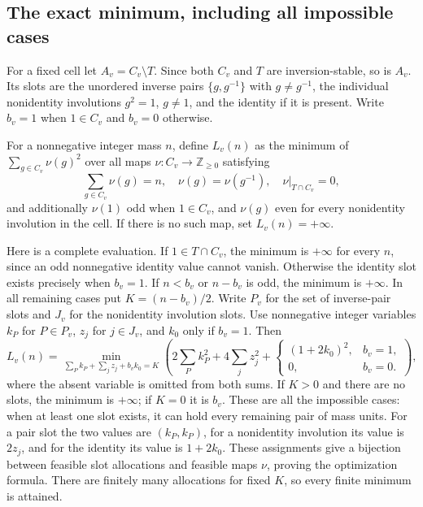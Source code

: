 \subsection{The exact minimum, including all impossible cases}
For a fixed cell let $A_v=C_v\setminus T$. Since both $C_v$ and $T$
are inversion-stable, so is $A_v$. Its slots are the unordered inverse
pairs $\{g,g^{-1}\}$ with $g\ne g^{-1}$, the individual nonidentity
involutions $g^2=1$, $g\ne1$, and the identity if it is present.
Write $b_v=1$ when $1\in C_v$ and $b_v=0$ otherwise.

For a nonnegative integer mass $n$, define $L_v(n)$ as the minimum of
$\sum_{g\in C_v}\nu(g)^2$ over all maps
$\nu:C_v\to\mathbb Z_{\geq0}$ satisfying
\[
 \sum_{g\in C_v}\nu(g)=n,\quad
 \nu(g)=\nu(g^{-1}),\quad
 \nu|_{T\cap C_v}=0,
\]
and additionally $\nu(1)$ odd when $1\in C_v$, and $\nu(g)$ even
for every nonidentity involution in the cell. If there is no such map,
set $L_v(n)=+\infty$.

Here is a complete evaluation. If $1\in T\cap C_v$, the minimum is
$+\infty$ for every $n$, since an odd nonnegative identity value cannot
vanish. Otherwise the identity slot exists precisely when $b_v=1$.
If $n<b_v$ or $n-b_v$ is odd, the minimum is $+\infty$.
In all remaining cases put $K=(n-b_v)/2$. Write $P_v$ for the set
of inverse-pair slots and $J_v$ for the nonidentity involution slots.
Use nonnegative integer variables $k_P$ for $P\in P_v$, $z_j$ for
$j\in J_v$, and $k_0$ only if $b_v=1$. Then
\[
 L_v(n)=\min_{\sum_P k_P+\sum_j z_j+b_vk_0=K}
 \left(2\sum_P k_P^2+4\sum_j z_j^2+
 \begin{cases}(1+2k_0)^2,&b_v=1,\\0,&b_v=0.\end{cases}\right),
\]
where the absent variable is omitted from both sums. If $K>0$ and
there are no slots, the minimum is $+\infty$; if $K=0$ it is $b_v$.
These are all the impossible cases: when at least one slot exists, it
can hold every remaining pair of mass units. For a pair slot the two
values are $(k_P,k_P)$, for a nonidentity involution its value is
$2z_j$, and for the identity its value is $1+2k_0$. These assignments
give a bijection between feasible slot allocations and feasible maps
$\nu$, proving the optimization formula. There are finitely many
allocations for fixed $K$, so every finite minimum is attained.

